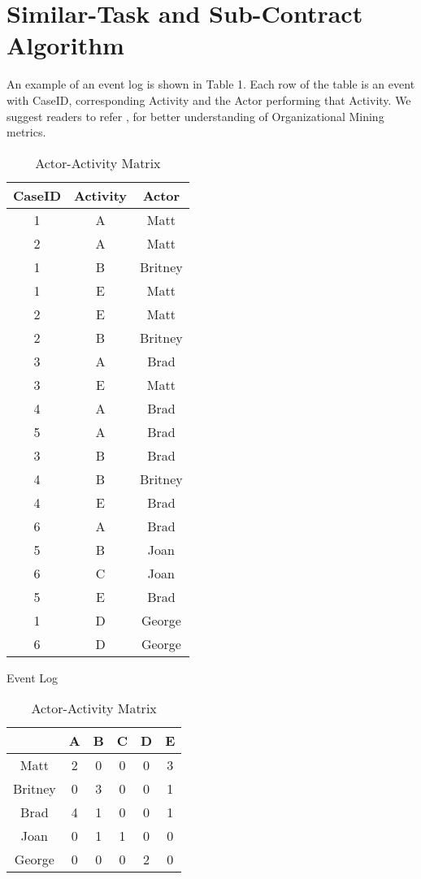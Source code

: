 \documentclass[11pt]{article}
\begin{document}
\section{Similar-Task and Sub-Contract Algorithm}
\par{An example  of an event log is shown in Table 1. Each row of the table is an event with CaseID, corresponding Activity and the Actor performing that Activity. We suggest readers to refer \cite{aalst}, \cite{mxml} for better understanding of Organizational Mining metrics.}
\renewcommand{\arraystretch}{.5}
\begin{table}
\CenterFloatBoxes
\begin{floatrow}
\ttabbox
  { \begin{tabular}{c c c}
  \hline
    CaseID & Activity & Actor    \\ \hline
1      & A        & Matt     \\
2      & A        & Matt     \\
1      & B        & Britney  \\
1      & E        & Matt     \\
2      & E        & Matt     \\
2      & B        & Britney \\
3      & A        & Brad     \\
3      & E        & Matt     \\
4      & A        & Brad     \\
5      & A        & Brad     \\
3      & B        & Brad     \\
4      & B        & Britney  \\
4      & E        & Brad     \\
6      & A        & Brad     \\
5      & B        & Joan     \\
6      & C        & Joan     \\
5      & E        & Brad     \\
1      & D        & George   \\
6      & D        & George  \\ \hline
  \end{tabular}
  }
  {\caption{\small Event Log}}
 \ttabbox
  { \begin{tabular}{|c|c|c|c|c|c|}
\hline
        & A & B & C & D & E \\ \hline
Matt    & 2 & 0 & 0 & 0 & 3 \\ \hline
Britney & 0 & 3 & 0 & 0 & 1 \\ \hline
Brad    & 4 & 1 & 0 & 0 & 1 \\ \hline
Joan    & 0 & 1 & 1 & 0 & 0 \\ \hline
George  & 0 & 0 & 0 & 2 & 0 \\ \hline
\end{tabular}
  }
 {\caption{\small Actor-Activity Matrix}}
\end{floatrow}
\end{table}
\end{document}
